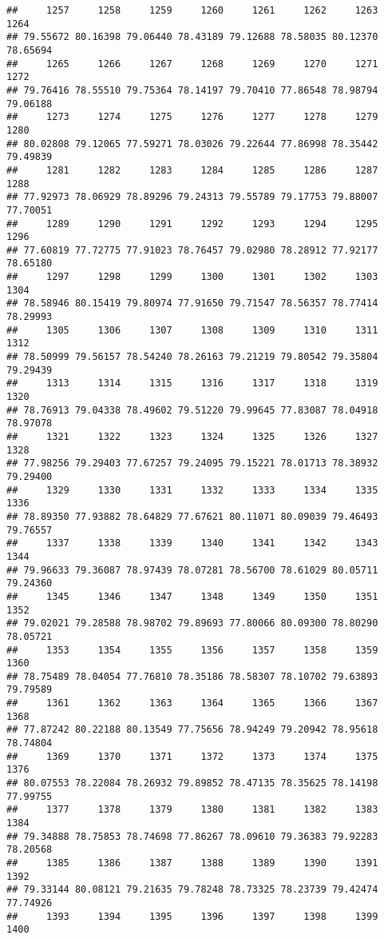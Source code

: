 \documentclass[
]{article}
\begin{document}
\begin{verbatim}
##     1257     1258     1259     1260     1261     1262     1263     1264 
## 79.55672 80.16398 79.06440 78.43189 79.12688 78.58035 80.12370 78.65694 
##     1265     1266     1267     1268     1269     1270     1271     1272 
## 79.76416 78.55510 79.75364 78.14197 79.70410 77.86548 78.98794 79.06188 
##     1273     1274     1275     1276     1277     1278     1279     1280 
## 80.02808 79.12065 77.59271 78.03026 79.22644 77.86998 78.35442 79.49839 
##     1281     1282     1283     1284     1285     1286     1287     1288 
## 77.92973 78.06929 78.89296 79.24313 79.55789 79.17753 79.88007 77.70051 
##     1289     1290     1291     1292     1293     1294     1295     1296 
## 77.60819 77.72775 77.91023 78.76457 79.02980 78.28912 77.92177 78.65180 
##     1297     1298     1299     1300     1301     1302     1303     1304 
## 78.58946 80.15419 79.80974 77.91650 79.71547 78.56357 78.77414 78.29993 
##     1305     1306     1307     1308     1309     1310     1311     1312 
## 78.50999 79.56157 78.54240 78.26163 79.21219 79.80542 79.35804 79.29439 
##     1313     1314     1315     1316     1317     1318     1319     1320 
## 78.76913 79.04338 78.49602 79.51220 79.99645 77.83087 78.04918 78.97078 
##     1321     1322     1323     1324     1325     1326     1327     1328 
## 77.98256 79.29403 77.67257 79.24095 79.15221 78.01713 78.38932 79.29400 
##     1329     1330     1331     1332     1333     1334     1335     1336 
## 78.89350 77.93882 78.64829 77.67621 80.11071 80.09039 79.46493 79.76557 
##     1337     1338     1339     1340     1341     1342     1343     1344 
## 79.96633 79.36087 78.97439 78.07281 78.56700 78.61029 80.05711 79.24360 
##     1345     1346     1347     1348     1349     1350     1351     1352 
## 79.02021 79.28588 78.98702 79.89693 77.80066 80.09300 78.80290 78.05721 
##     1353     1354     1355     1356     1357     1358     1359     1360 
## 78.75489 78.04054 77.76810 78.35186 78.58307 78.10702 79.63893 79.79589 
##     1361     1362     1363     1364     1365     1366     1367     1368 
## 77.87242 80.22188 80.13549 77.75656 78.94249 79.20942 78.95618 78.74804 
##     1369     1370     1371     1372     1373     1374     1375     1376 
## 80.07553 78.22084 78.26932 79.89852 78.47135 78.35625 78.14198 77.99755 
##     1377     1378     1379     1380     1381     1382     1383     1384 
## 79.34888 78.75853 78.74698 77.86267 78.09610 79.36383 79.92283 78.20568 
##     1385     1386     1387     1388     1389     1390     1391     1392 
## 79.33144 80.08121 79.21635 79.78248 78.73325 78.23739 79.42474 77.74926 
##     1393     1394     1395     1396     1397     1398     1399     1400 

\end{verbatim}
\end{document}
